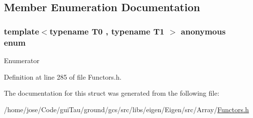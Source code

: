 \subsection{Member Enumeration Documentation}
\hypertarget{structei__functor__traits_3_01std_1_1project1st_3_01_t0_00_01_t1_01_4_01_4_a6c5bfec6710b8247140981e45c9968a8}{\subsubsection[{anonymous enum}]{\setlength{\rightskip}{0pt plus 5cm}template$<$typename T0 , typename T1 $>$ anonymous enum}}\label{structei__functor__traits_3_01std_1_1project1st_3_01_t0_00_01_t1_01_4_01_4_a6c5bfec6710b8247140981e45c9968a8}
\begin{Desc}
\item[Enumerator]\par
\begin{description}
\item[{\em 
\hypertarget{structei__functor__traits_3_01std_1_1project1st_3_01_t0_00_01_t1_01_4_01_4_a6c5bfec6710b8247140981e45c9968a8a0c01721de3d32b354e8601f81aebd626}{Cost}\label{structei__functor__traits_3_01std_1_1project1st_3_01_t0_00_01_t1_01_4_01_4_a6c5bfec6710b8247140981e45c9968a8a0c01721de3d32b354e8601f81aebd626}
}]\item[{\em 
\hypertarget{structei__functor__traits_3_01std_1_1project1st_3_01_t0_00_01_t1_01_4_01_4_a6c5bfec6710b8247140981e45c9968a8a0237ba742ccd71586956697bfd5ad7ac}{Packet\-Access}\label{structei__functor__traits_3_01std_1_1project1st_3_01_t0_00_01_t1_01_4_01_4_a6c5bfec6710b8247140981e45c9968a8a0237ba742ccd71586956697bfd5ad7ac}
}]\end{description}
\end{Desc}


Definition at line 285 of file Functors.\-h.



The documentation for this struct was generated from the following file\-:\begin{DoxyCompactItemize}
\item 
/home/jose/\-Code/gui\-Tau/ground/gcs/src/libs/eigen/\-Eigen/src/\-Array/\hyperlink{_array_2_functors_8h}{Functors.\-h}\end{DoxyCompactItemize}
